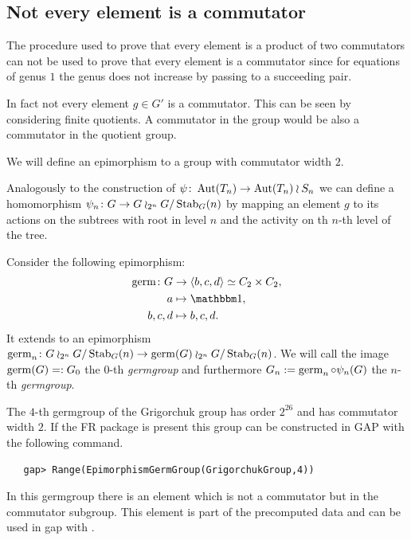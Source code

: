 \documentclass[a4paper,11pt]{amsart}
\begin{document}
\subsection{Not every element is a commutator}
The procedure used to prove that every element is a product of two commutators 
can not be used to prove that every element is a
commutator since for equations of genus $1$ the 
genus does not increase by passing to a succeeding pair. 

In fact not every element $g\in G'$ is a commutator. This can be seen by
considering finite quotients. A commutator in the group would be also a
commutator in the quotient group. 

We will define an epimorphism to a group with commutator width $2$.

Analogously to the construction of $\psi\colon \operatorname{{Aut}}(T_n )\to \operatorname{{Aut}}(T_n) \wr S_n$
we can define a homomorphism $\psi_n\colon G \to G\wr_{2^n} {G/\operatorname{Stab}_G(n)}$ by
mapping an element $g$ to its actions on the subtrees with root in level $n$
and the activity on th $n$-th level of the tree.

Consider the following epimorphism:
\begin{align*}
\germ\colon G&\to\left<b,c,d\right>\simeq C_2\times C_2, \\
a&\mapsto\id,\\
b,c,d&\mapsto b,c,d.
\end{align*} It extends to 
an epimorphism $\operatorname{germ}_n\colon G\wr_{2^n} {G/\operatorname{Stab}_G(n)}\to \operatorname{germ}(G)\wr_{2^n} {G/\operatorname{Stab}_G(n)}$. 
We will call the image $\operatorname{germ}(G)=:G_0$ the $0$-th \emph{germgroup} and furthermore
$G_n := \operatorname{germ}_n \circ \psi_n(G)$ the $n$-th \emph{germgroup}.

The $4$-th germgroup of the Grigorchuk group has order $2^{26}$ and has commutator width $2$.
If the FR package is present this group can be constructed in GAP with 
the following command. 
\begin{lstlisting}
   gap> Range(EpimorphismGermGroup(GrigorchukGroup,4))
\end{lstlisting}
In this germgroup there is an element which is not a commutator 
but in the commutator subgroup. This element is part of the
precomputed data and can be used in gap with
.	
\end{document}
